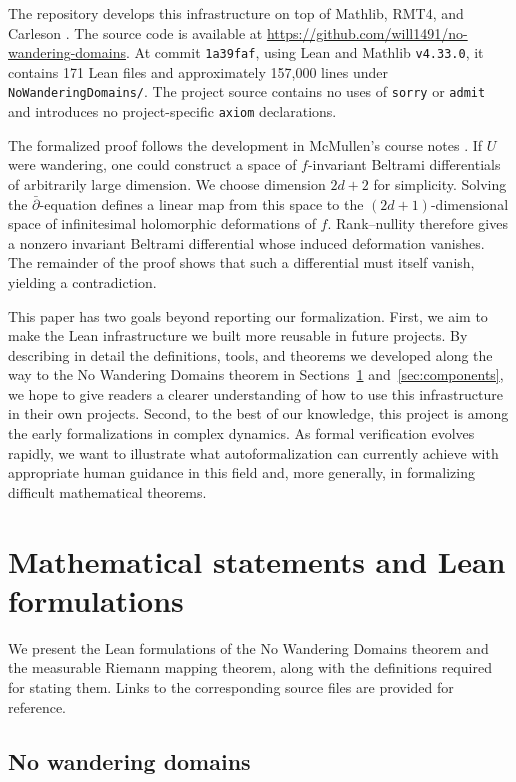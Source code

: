 \documentclass[letterpaper]{amsart}
\numberwithin{equation}{section}
\numberwithin{figure}{section}
\theoremstyle{plain}
\theoremstyle{definition}
\let\lean\nolinkurl
\begin{document}
The repository develops this infrastructure on top of Mathlib, RMT4, and Carleson \cite{Carleson,RMT4,Mathlib}. The source code is available at \url{https://github.com/will1491/no-wandering-domains}. At commit \lean{1a39faf}, using Lean and Mathlib \lean{v4.33.0}, it contains 171 Lean files and approximately 157,000 lines under \lean{NoWanderingDomains/}. The project source contains no uses of \lean{sorry} or \lean{admit} and introduces no project-specific \lean{axiom} declarations.

The formalized proof follows the development in McMullen's course notes \cite{McMullen}. If $U$ were wandering, one could construct a space of $f$-invariant Beltrami differentials of arbitrarily large dimension. We choose dimension $2d+2$ for simplicity. Solving the $\bar\partial$-equation defines a linear map from this space to the $(2d+1)$-dimensional space of infinitesimal holomorphic deformations of $f$. Rank--nullity therefore gives a nonzero invariant Beltrami differential whose induced deformation vanishes. The remainder of the proof shows that such a differential must itself vanish, yielding a contradiction.

This paper has two goals beyond reporting our formalization. First, we aim to make the Lean infrastructure we built more reusable in future projects. By describing in detail the definitions, tools, and theorems we developed along the way to the No Wandering Domains theorem in Sections~\ref{sec:statements} and~\ref{sec:components}, we hope to give readers a clearer understanding of how to use this infrastructure in their own projects. Second, to the best of our knowledge, this project is among the early formalizations in complex dynamics. As formal verification evolves rapidly, we want to illustrate what autoformalization can currently achieve with appropriate human guidance in this field and, more generally, in formalizing difficult mathematical theorems.

\section{Mathematical statements and Lean formulations}
\label{sec:statements}

We present the Lean formulations of the No Wandering Domains theorem and the measurable Riemann mapping theorem, along with the definitions required for stating them. Links to the corresponding source files are provided for reference.

\subsection{No wandering domains}
\end{document}
